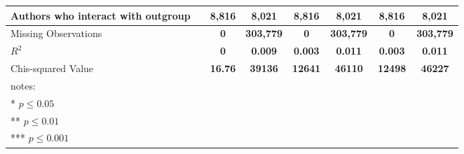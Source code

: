 \documentclass[letterpaper]{article}
\begin{document}
\begin{table*}
\begin{threeparttable}
\begin{adjustbox}{max width=\textwidth}
\begin{tabular}{|p{3.5cm}|c|cccc|cccc|cccc|cccc|cccc|cccc|}
    Authors who interact with outgroup &       & \multicolumn{4}{c|}{\textbf{8,816}} & \multicolumn{4}{c|}{\textbf{8,021}} & \multicolumn{4}{c|}{\textbf{8,816}} & \multicolumn{4}{c|}{\textbf{8,021}} & \multicolumn{4}{c|}{\textbf{8,816}} & \multicolumn{4}{c|}{\textbf{8,021}} \\\hline
    Missing Observations &       & \multicolumn{4}{c|}{\textbf{0}} & \multicolumn{4}{c|}{\textbf{303,779}} & \multicolumn{4}{c|}{\textbf{0}} & \multicolumn{4}{c|}{\textbf{303,779}} & \multicolumn{4}{c|}{\textbf{0}} & \multicolumn{4}{c|}{\textbf{303,779}} \\\hline
    $R^2$ &       & \multicolumn{4}{c|}{\textbf{0}} & \multicolumn{4}{c|}{\textbf{0.009}} & \multicolumn{4}{c|}{\textbf{0.003}} & \multicolumn{4}{c|}{\textbf{0.011}} & \multicolumn{4}{c|}{\textbf{0.003}} & \multicolumn{4}{c|}{\textbf{0.011}} \\\hline
    Chis-squared Value &       & \multicolumn{4}{c|}{\textbf{16.76}} & \multicolumn{4}{c|}{\textbf{39136}} & \multicolumn{4}{c|}{\textbf{12641}} & \multicolumn{4}{c|}{\textbf{46110}} & \multicolumn{4}{c|}{\textbf{12498}} & \multicolumn{4}{c|}{\textbf{46227}} \\\hline
    \bottomrule
    \multicolumn{18}{l}{notes:}{}\\
    \multicolumn{18}{l}{* $p \leq 0.05$}\\
    \multicolumn{18}{l}{** $p \leq 0.01$}\\
    \multicolumn{18}{l}{*** $p \leq 0.001$}\\
    \end{tabular}%

\end{adjustbox}
\end{threeparttable}
\label{tab:regrtab2}
\end{table*}
\end{document}
